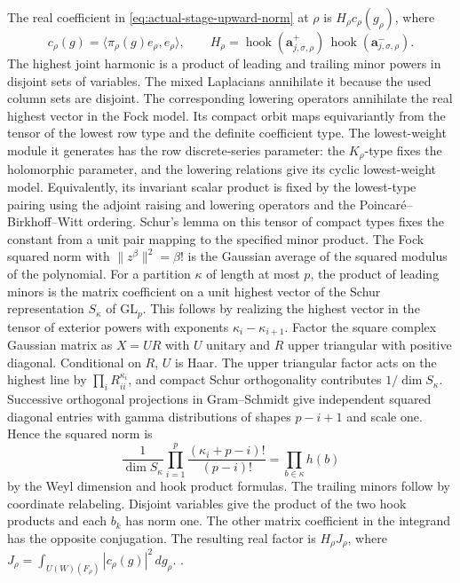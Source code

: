 The real coefficient in \eqref{eq:actual-stage-upward-norm}
at \(\rho\) is \(H_\rho c_\rho(g_\rho)\), where
\[
 c_\rho(g)=\langle\pi_\rho(g)e_\rho,e_\rho\rangle,\qquad
 H_\rho=\operatorname{hook}(\mathbf a^+_{j,\sigma,\rho})\,
        \operatorname{hook}(\mathbf a^-_{j,\sigma,\rho}).
\]
The highest joint harmonic is a product of leading and trailing
minor powers in disjoint sets of variables. The mixed
Laplacians annihilate it because the used column sets are
disjoint. The corresponding lowering operators annihilate the
real highest vector in the Fock model. Its compact orbit maps
equivariantly from the tensor of the lowest row type and the
definite coefficient type. The lowest-weight module it generates
has the row discrete-series parameter: the \(K_\rho\)-type fixes
the holomorphic parameter, and the lowering relations give its
cyclic lowest-weight model. Equivalently, its invariant scalar
product is fixed by the lowest-type pairing using the adjoint
raising and lowering operators and the Poincar\'e--Birkhoff--Witt
ordering. Schur's lemma on this tensor of compact types fixes
the constant from a unit pair mapping to the specified minor
product. The Fock squared norm with \(\|z^\beta\|^2=\beta!\)
is the Gaussian average of the squared modulus of the
polynomial. For a partition \(\kappa\) of length at most \(p\),
the product of leading minors is the matrix coefficient on a
unit highest vector of the Schur representation \(S_\kappa\)
of \(\mathrm{GL}_p\). This follows by realizing the highest
vector in the tensor of exterior powers with exponents
\(\kappa_i-\kappa_{i+1}\). Factor the square complex Gaussian
matrix as \(X=UR\) with \(U\) unitary and \(R\) upper triangular
with positive diagonal. Conditional on \(R\), \(U\) is Haar.
The upper triangular factor acts on the highest line by
\(\prod_i R_{ii}^{\kappa_i}\), and compact Schur orthogonality
contributes \(1/\dim S_\kappa\). Successive orthogonal
projections in Gram--Schmidt give independent squared diagonal
entries with gamma distributions of shapes \(p-i+1\)
and scale one. Hence the squared norm is
\[
 \frac{1}{\dim S_\kappa}
       \prod_{i=1}^p\frac{(\kappa_i+p-i)!}{(p-i)!}
 =\prod_{b\in\kappa}h(b)
\]
by the Weyl dimension and hook product formulas. The trailing
minors follow by coordinate relabeling. Disjoint variables
give the product of the two hook products and each \(b_k\) has
norm one. The other
matrix coefficient in the integrand has the opposite conjugation.
The resulting real factor is
\(H_\rho J_\rho\), where
\(J_\rho=\int_{U(W)(F_\rho)}|c_\rho(g)|^2\,dg_\rho\).
.

